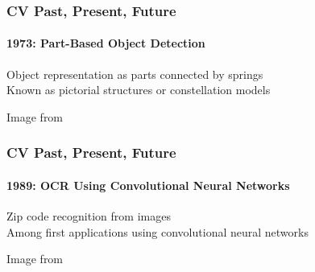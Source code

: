 \documentclass[xetex,professionalfont]{beamer}
\begin{document}

\begin{frame}
\frametitle{CV Past, Present, Future}
\framesubtitle{1973: Part-Based Object Detection}

Object representation as parts connected by springs\\\medskip %
Known as pictorial structures or constellation models %

\bigskip
\begin{center}
    {\centering Image from \cite{fischler1973}}
\end{center}

\end{frame}


\begin{frame}
\frametitle{CV Past, Present, Future}
\framesubtitle{1989: OCR Using Convolutional Neural Networks}


Zip code recognition from images\\\medskip %
Among first applications using convolutional neural networks %

\bigskip
\begin{center}
    {\centering Image from \cite{lecun1989}}
\end{center}

\end{frame}
\end{document}
